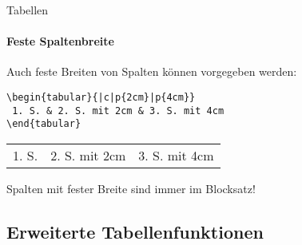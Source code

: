 \begin{frame}[fragile]{Tabellen}
\framesubtitle{Feste Spaltenbreite}
Auch feste Breiten von Spalten können vorgegeben werden:
\begin{codeblock}
\begin{verbatim}
\begin{tabular}{|c|p{2cm}|p{4cm}}
 1. S. & 2. S. mit 2cm & 3. S. mit 4cm
\end{tabular}
\end{verbatim}
\end{codeblock}
\pause

\medskip
    \begin{table}
    \center
\pause\bigskip

    \begin{tabular}{|c|p{2cm}|p{4cm}}
      1. S. & 2. S. mit 2cm & 3. S. mit 4cm
    \end{tabular}
    \end{table}\pause
    \medskip
    
Spalten mit fester Breite sind immer im Blocksatz!
\end{frame}

\subsection{Erweiterte Tabellenfunktionen}


